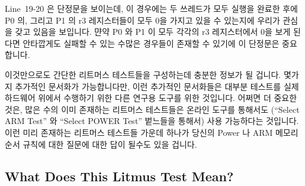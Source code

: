 Line~19-20 은 단정문을 보이는데, 이 경우에는 두 쓰레드가 모두 실행을 완료한
후에 P0 의, 그리고 P1 의 r3 레지스터들이 모두 0을 가지고 있을 수 있는지에
우리가 관심을 갖고 있음을 보입니다.
먄약 P0 와 P1 이 모두 각각의 r3 레지스터에서 0을 보게 된다면 안타깝게도 실패할
수 있는 수많은 경우들이 존재할 수 있기에 이 단정문은 중요합니다.
\iffalse

Lines~8-17 are the lines of code for each process. A given process
can have empty lines, as is the case for P0's line~11 and P1's
lines~12-17.
Labels and branches are permitted, as demonstrated by the branch
on line~14 to the label on line~17. That said, too-free use of branches
will expand the state space. Use of loops is a particularly good way to
explode your state space.

Lines~19-20 show the assertion, which in this case indicates that we
are interested in whether P0's and P1's r3 registers can both contain
zero after both threads complete execution. This assertion is important
because there are a number of use cases that would fail miserably if
both P0 and P1 saw zero in their respective r3 registers.
\fi

이것만으로도 간단한 리트머스 테스트들을 구성하는데 충분한 정보가 될 겁니다.
몇가지 추가적인 문서화가 가능합니다만, 이런 추가적인 문서화들은 대부분 테스트를
실제 하드웨어 위에서 수행하기 위한 다른 연구용 도구를 위한 것입니다.
어쩌면 더 중요한 것은, 많은 수의 이미 존재하는 리트머스 테스트들은 온라인
도구를 통해서도 (``Select ARM Test'' 와 ``Select POWER Test'' 벝느들을 통해서)
사용 가능하다는 것입니다.
이런 미리 존재하는 리트머스 테스트들 가운데 하나가 당신의 Power 나 ARM 메모리
순서 규칙에 대한 질문에 대한 답이 될수도 있을 겁니다.
\iffalse

This should give you enough information to construct simple litmus
tests. Some additional documentation is available, though much of this
additional documentation is intended for a different research tool that
runs tests on actual hardware. Perhaps more importantly, a large number of
pre-existing litmus tests are available with the online tool (available
via the ``Select ARM Test'' and ``Select POWER Test'' buttons). It is
quite likely that one of these pre-existing litmus tests will answer
your Power or ARM memory-ordering question.
\fi

\subsection{What Does This Litmus Test Mean?}
\label{sec:formal:What Does This Litmus Test Mean?}

